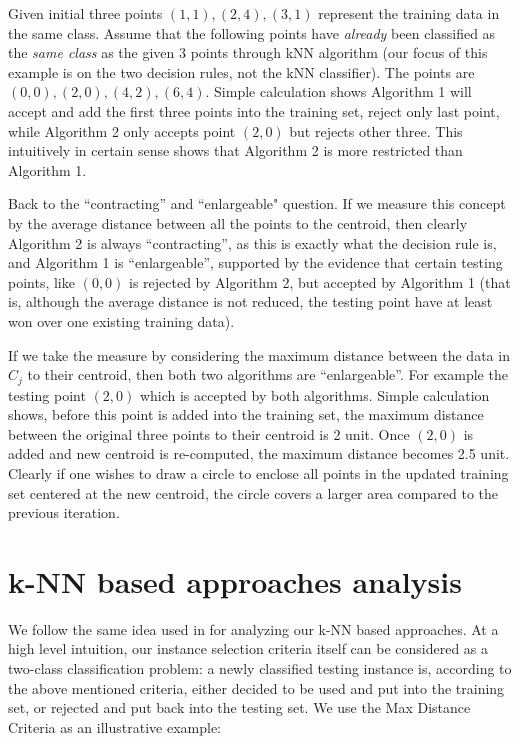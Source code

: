 \documentclass[10pt]{article}
\begin{document}
Given initial three points $(1,1),(2,4),(3,1)$ represent the training data in the same class. Assume that the following points have \textit{already} been classified as the \textit{same class} as the given 3 points through kNN algorithm (our focus of this example is on the two decision rules, not the kNN classifier). The points are $(0,0),(2,0),(4,2),(6,4)$. Simple calculation shows Algorithm 1 will accept and add the first three points into the training set, reject only last point, while Algorithm 2 only accepts point $(2,0)$ but rejects other three. This intuitively in certain sense shows that Algorithm 2 is more restricted than Algorithm 1.

Back to the ``contracting'' and ``enlargeable" question. If we measure this concept by the average distance between all the points to the centroid, then clearly Algorithm 2 is always ``contracting'', as this is exactly what the decision rule is, and Algorithm 1 is ``enlargeable'', supported by the evidence that certain testing points, like $(0,0)$ is rejected by Algorithm 2, but accepted by Algorithm 1 (that is, although the average distance is not reduced, the testing point have at least won over one existing training data).

If we take the measure by considering the maximum distance between the data in $C_j$ to their centroid, then both two algorithms are ``enlargeable''. For example the testing point $(2,0)$ which is accepted by both algorithms. Simple calculation shows, before this point is added into the training set, the maximum distance between the original three points to their centroid is 2 unit. Once $(2,0)$ is added and new centroid is re-computed, the maximum distance becomes 2.5 unit. Clearly if one wishes to draw a circle to enclose all points in the updated training set centered at the new centroid, the circle covers a larger area compared to the previous iteration. 

\section{k-NN based approaches analysis}
We follow the same idea used in \cite{zhang2013network} for analyzing our k-NN based approaches. At a high level intuition, our instance selection criteria itself can be considered as a two-class classification problem: a newly classified testing instance is, according to the above mentioned criteria, either decided to be used and put into the training set, or rejected and put back into the testing set. We use the Max Distance Criteria as an illustrative example:
\end{document}
